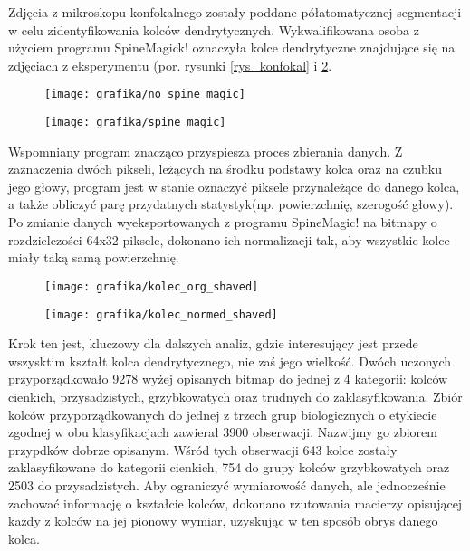 \documentclass{article}
\begin{document}
Zdjęcia z mikroskopu konfokalnego zostały poddane półatomatycznej segmentacji w celu zidentyfikowania kolców dendrytycznych. 
Wykwalifikowana osoba z użyciem programu SpineMagick! oznaczyła kolce dendrytyczne znajdujące się na zdjęciach z eksperymentu (por. rysunki \ref{rys_konfokal} i \ref{rys_spine_magick}.
\begin{figure}
\centering
\begin{minipage}{.4\textwidth}
  \centering
  \texttt{[image: grafika/no\_spine\_magic]}
  \label{rys_konfokal}
\end{minipage}%
\hspace{1cm}
\begin{minipage}{.4\textwidth}
  \centering
  \texttt{[image: grafika/spine\_magic]}
  \label{rys_spine_magick}
\end{minipage}
\end{figure}
Wspomniany program znacząco przyspiesza proces zbierania danych.
Z zaznaczenia dwóch pikseli, leżących na środku podstawy kolca oraz na czubku jego głowy, program jest w stanie oznaczyć piksele przynależące do danego kolca, a także obliczyć parę przydatnych statystyk(np. powierzchnię, szerogość głowy).
Po zmianie danych wyeksportowanych z programu SpineMagic! na bitmapy o rozdzielczości 64x32 piksele, dokonano ich normalizacji tak, aby wszystkie kolce miały taką samą powierzchnię.


\begin{figure}
\centering
\begin{minipage}[t]{.4\textwidth}
  \vspace{0pt}
  \texttt{[image: grafika/kolec\_org\_shaved]}
  \label{rys_konfokal}
\end{minipage}%
\hspace{1cm}
\begin{minipage}[t]{.4\textwidth}
  \vspace{0pt}\raggedright
  \centering
  \texttt{[image: grafika/kolec\_normed\_shaved]}
  \label{rys_spine_magick}
\end{minipage}
\end{figure}


Krok ten jest, kluczowy dla dalszych analiz, gdzie interesujący jest przede wszysktim kształt kolca dendrytycznego, nie zaś jego wielkość.
Dwóch uczonych przyporządkowało 9278 wyżej opisanych bitmap do jednej z 4 kategorii: kolców cienkich, przysadzistych, grzybkowatych oraz trudnych do zaklasyfikowania.
Zbiór kolców przyporządkowanych do jednej z trzech grup biologicznych o etykiecie zgodnej w obu klasyfikacjach zawierał 3900 obserwacji.
Nazwijmy go zbiorem przypdków dobrze opisanym.
Wśród tych obserwacji 643 kolce zostały zaklasyfikowane do kategorii cienkich, 754 do grupy kolców grzybkowatych oraz 2503 do przysadzistych.
Aby ograniczyć wymiarowość danych, ale jednocześnie zachować informację o kształcie kolców, dokonano rzutowania macierzy opisującej każdy z kolców na jej pionowy wymiar, uzyskując w ten sposób obrys danego kolca.
\end{document}
